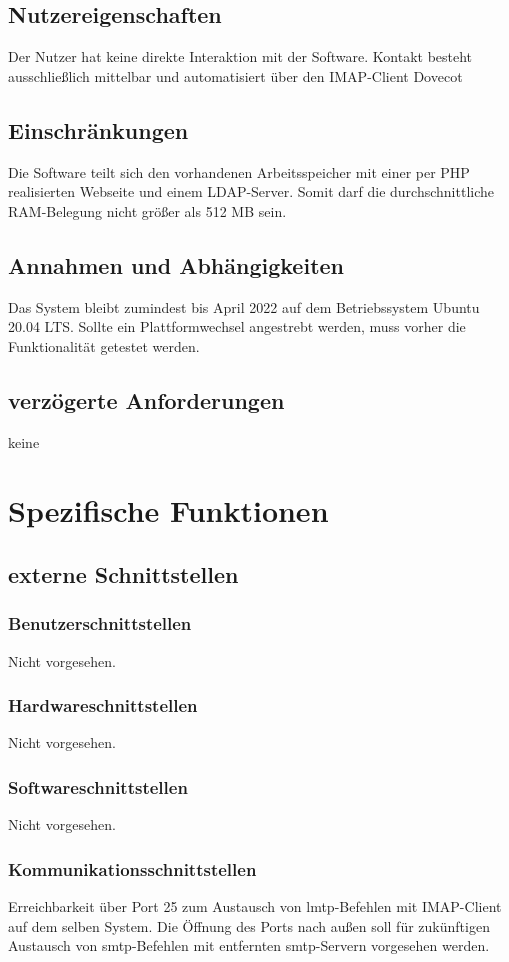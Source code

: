 \subsection{Nutzereigenschaften}
Der Nutzer hat keine direkte Interaktion mit der Software. Kontakt besteht ausschließlich mittelbar und automatisiert über den IMAP-Client Dovecot
\subsection{Einschränkungen}
Die Software teilt sich den vorhandenen Arbeitsspeicher mit einer per PHP realisierten Webseite und einem LDAP-Server. Somit darf die durchschnittliche RAM-Belegung nicht größer als 512 MB sein.
\subsection{Annahmen und Abhängigkeiten}
Das System bleibt zumindest bis April 2022 auf dem Betriebssystem Ubuntu 20.04 LTS. Sollte ein Plattformwechsel angestrebt werden, muss vorher die Funktionalität getestet werden.
\subsection{verzögerte Anforderungen}
keine 
\section{Spezifische Funktionen}

\subsection{externe Schnittstellen}
\subsubsection{Benutzerschnittstellen}
Nicht vorgesehen.
\subsubsection{Hardwareschnittstellen}
Nicht vorgesehen.
\subsubsection{Softwareschnittstellen}
Nicht vorgesehen.
\subsubsection{Kommunikationsschnittstellen}
Erreichbarkeit über Port 25 zum Austausch von \ac{lmtp}-Befehlen mit IMAP-Client auf dem selben System. Die Öffnung des Ports nach außen soll für zukünftigen Austausch von \ac{smtp}-Befehlen mit entfernten \ac{smtp}-Servern vorgesehen werden.
